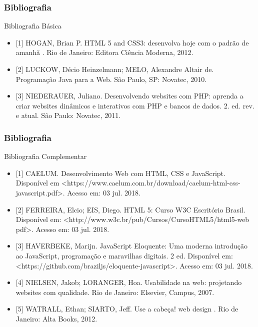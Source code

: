 \documentclass[
	10pt, %
	t, %
]{beamer}
\begin{document}
\begin{frame}
	\frametitle{Bibliografia}

	\begin{block}{Bibliografia Básica}
		\begin{itemize}
			\item {\small [1] HOGAN, Brian P. HTML 5 and CSS3: desenvolva hoje com o padrão de amanhã . Rio de Janeiro: Editora Ciência Moderna, 2012.}
			\item {\small [2] LUCKOW, Décio Heinzelmann; MELO, Alexandre Altair de. Programação Java para a Web. São Paulo, SP: Novatec, 2010.}
			\item {\small [3] NIEDERAUER, Juliano. Desenvolvendo websites com PHP: aprenda a criar websites dinâmicos e interativos com PHP e bancos de dados. 2. ed. rev. e atual. São Paulo: Novatec, 2011.}
		\end{itemize}
	\end{block}
\end{frame}

\begin{frame}
	\frametitle{Bibliografia}

	\begin{block}{Bibliografia Complementar}
		\begin{itemize}
			\item {\small [1] CAELUM. Desenvolvimento Web com HTML, CSS e JavaScript. Disponível em <https://www.caelum.com.br/download/caelum-html-css-javascript.pdf>. Acesso em: 03 jul. 2018.}
			\item {\small [2] FERREIRA, Elcio; EIS, Diego. HTML 5: Curso W3C Escritório Brasil. Disponível em: <http://www.w3c.br/pub/Cursos/CursoHTML5/html5-web pdf>. Acesso em: 03 jul. 2018.}
			\item {\small [3] HAVERBEKE, Marijn. JavaScript Eloquente: Uma moderna introdução ao JavaScript, programação e maravilhas digitais. 2 ed. Disponível em: <https://github.com/braziljs/eloquente-javascript>. Acesso em: 03 jul. 2018.}
			\item {\small [4] NIELSEN, Jakob; LORANGER, Hoa. Usabilidade na web: projetando websites com qualidade. Rio de Janeiro: Elsevier, Campus, 2007.}
			\item {\small [5] WATRALL, Ethan; SIARTO, Jeff. Use a cabeça! web design . Rio de Janeiro: Alta Books, 2012.}
		\end{itemize}
		
	\end{block}

\end{frame}
\end{document}
